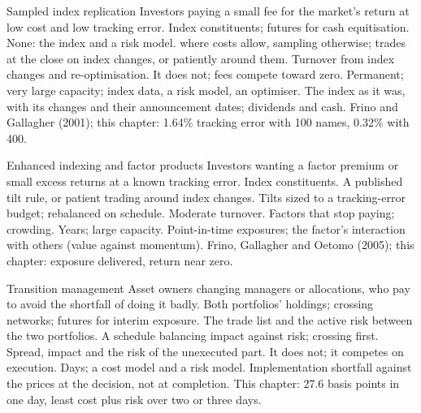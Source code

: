 \begin{strategyfile}{Sampled index replication}\label{strat:s1:the-asset-managers-strategies:index}
 Investors paying a small fee for the market's return at low cost and low tracking error.
 Index constituents; futures for cash equitisation.
 None: the index and a risk model.
  where costs allow, sampling otherwise; trades at the close on index changes, or patiently around them.
 Turnover from index changes and re-optimisation.
 It does not; fees compete toward zero.
 Permanent; very large capacity; index data, a risk model, an optimiser.
 The index as it was, with its changes and their announcement dates; dividends and cash.
 Frino and Gallagher (2001); this chapter: 1.64\% tracking error with 100 names, 0.32\% with 400.
\end{strategyfile}

\begin{strategyfile}{Enhanced indexing and factor products}\label{strat:s1:the-asset-managers-strategies:enhanced}
 Investors wanting a factor premium or small excess returns at a known tracking error.
 Index constituents.
 A published tilt rule, or patient trading around index changes.
 Tilts sized to a tracking-error budget; rebalanced on schedule.
 Moderate turnover.
 Factors that stop paying; crowding.
 Years; large capacity.
 Point-in-time exposures; the factor's interaction with others (value against momentum).
 Frino, Gallagher and Oetomo (2005); this chapter: exposure delivered, return near zero.
\end{strategyfile}

\begin{strategyfile}{Transition management}\label{strat:s1:the-asset-managers-strategies:transition}
 Asset owners changing managers or allocations, who pay to avoid the shortfall of doing it badly.
 Both portfolios' holdings; crossing networks; futures for interim exposure.
 The trade list and the active risk between the two portfolios.
 A schedule balancing impact against risk; crossing first.
 Spread, impact and the risk of the unexecuted part.
 It does not; it competes on execution.
 Days; a cost model and a risk model.
 Implementation shortfall against the prices at the decision, not at completion.
 This chapter: 27.6 basis points in one day, least cost plus risk over two or three days.
\end{strategyfile}

